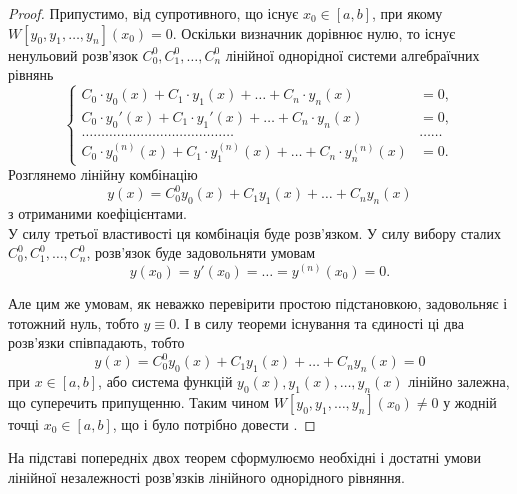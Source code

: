 \begin{proof}
	Припустимо, від супротивного, що існує $x_0 \in [a,b]$, при якому $W[y_0, y_1, \ldots, y_n](x_0) = 0$. Оскільки визначник дорівнює нулю, то існує ненульовий розв’язок $C_0^0, C_1^0, \ldots, C_n^0$ лінійної однорідної системи алгебраїчних рівнянь \begin{equation*}
		\left\{ \begin{aligned}
			C_0 \cdot y_0(x) + C_1 \cdot y_1(x) + \ldots + C_n \cdot y_n(x) &= 0, \\
			C_0 \cdot y_0'(x) + C_1 \cdot y_1'(x) + \ldots + C_n \cdot y_n(x) &= 0, \\
			\ldots \ldots \ldots \ldots \ldots \ldots \ldots \ldots \ldots \ldots \ldots \ldots \ldots & \ldots \ldots \\
			C_0 \cdot y_0^{(n)}(x) + C_1 \cdot y_1^{(n)}(x) + \ldots + C_n \cdot y_n^{(n)}(x) &= 0.
		\end{aligned} \right.
	\end{equation*}
	Розглянемо лінійну комбінацію 
	\begin{equation*}
		y(x) = C_0^0 y_0(x) + C_1 y_1(x) + \ldots + C_n y_n(x)
	\end{equation*}
	з отриманими коефіцієнтами. \\

	У силу третьої властивості ця комбінація буде розв’язком. У силу вибору сталих $C_0^0, C_1^0, \ldots, C_n^0$, розв’язок буде задовольняти умовам
	\begin{equation*}
		y(x_0) = y'(x_0) = \ldots = y^{(n)}(x_0) = 0.
	\end{equation*}
 
	Але цим же умовам, як неважко перевірити простою підстановкою, задовольняє і тотожний нуль, тобто $y \equiv 0$. І в силу теореми існування та єдиності ці два розв’язки співпадають, тобто 
	\begin{equation*}
		y(x) = C_0^0 y_0(x) + C_1 y_1(x) + \ldots + C_n y_n(x) = 0
	\end{equation*}
	при $x \in [a,b]$, або система функцій $y_0(x), y_1(x), \ldots, y_n(x)$ лінійно залежна, що суперечить припущенню. Таким чином $W[y_0, y_1, \ldots, y_n](x_0) \ne 0$ у жодній точці $x_0 \in [a,b]$, що і було потрібно довести .
\end{proof}

На підставі попередніх двох теорем сформулюємо необхідні і достатні умови лінійної незалежності розв’язків лінійного однорідного рівняння.

